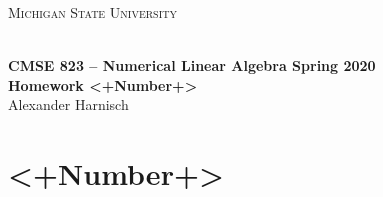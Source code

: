 \documentclass[a4paper, 11pt]{article}
\begin{document}
\noindent
\centerline{\small{\textsc{Michigan State University}}} \\
\large{\textbf{CMSE 823 – Numerical Linear Algebra \hfill Spring 2020 \\
Homework <+Number+>}} \\
Alexander Harnisch \\
\noindent\makebox[\linewidth]{\rule{\textwidth}{0.4pt}}

\section*{<+Number+>}
\end{document}

